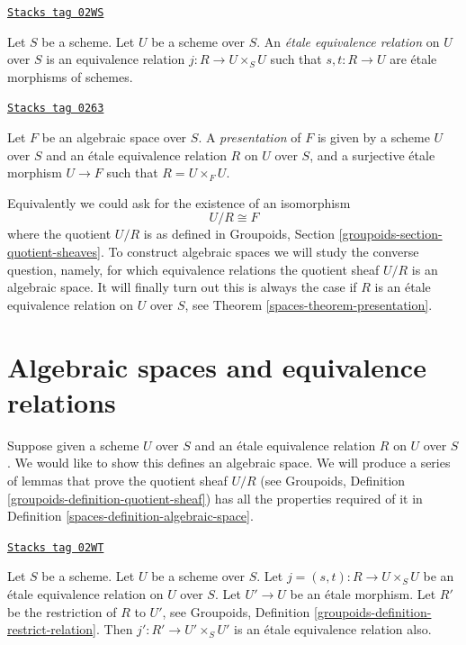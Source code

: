 \begin{definition}
\label{spaces-definition-etale-equivalence-relation}
\href{https://stacks.math.columbia.edu/tag/02WS}{\texttt{Stacks tag 02WS}}

Let $S$ be a scheme. Let $U$ be a scheme over $S$.
An {\it \'etale equivalence relation} on $U$ over $S$
is an equivalence relation $j : R \to U \times_S U$
such that $s, t : R \to U$ are \'etale morphisms of schemes.
\end{definition}

\begin{definition}[Presentation]
\label{spaces-definition-presentation}
\href{https://stacks.math.columbia.edu/tag/0263}{\texttt{Stacks tag 0263}}

Let $F$ be an algebraic space over $S$.
A {\it presentation} of $F$ is given by a scheme
$U$ over $S$ and an \'etale equivalence relation $R$ on $U$ over $S$, and
a surjective \'etale morphism $U \to F$ such that $R = U \times_F U$.
\end{definition}

Equivalently we could ask for the existence of an isomorphism
$$
U/R \cong F
$$
where the quotient $U/R$ is as defined in
Groupoids, Section \ref{groupoids-section-quotient-sheaves}.
To construct algebraic spaces we will study the converse question, namely,
for which equivalence relations the quotient sheaf $U/R$ is an algebraic space.
It will finally turn out this is always the case if $R$ is an \'etale
equivalence relation on $U$ over $S$, see Theorem \ref{spaces-theorem-presentation}.

\section{Algebraic spaces and equivalence relations}
\label{spaces-section-spaces-from-equivalence-relations}
Suppose given a scheme $U$ over $S$
and an \'etale equivalence relation $R$ on $U$ over $S$.
We would like to show this defines an algebraic space.
We will produce a series of lemmas that prove the quotient sheaf $U/R$
(see Groupoids, Definition \ref{groupoids-definition-quotient-sheaf})
has all the properties required
of it in Definition \ref{spaces-definition-algebraic-space}.

\begin{lemma}
\label{spaces-lemma-pullback-etale-equivalence-relation}
\href{https://stacks.math.columbia.edu/tag/02WT}{\texttt{Stacks tag 02WT}}

Let $S$ be a scheme. Let $U$ be a scheme over $S$.
Let $j = (s, t) : R \to U \times_S U$
be an \'etale equivalence relation on $U$ over $S$.
Let $U' \to U$ be an \'etale morphism.
Let $R'$ be the restriction of $R$ to $U'$, see
Groupoids, Definition \ref{groupoids-definition-restrict-relation}.
Then $j' : R' \to U' \times_S U'$ is an \'etale equivalence
relation also.
\end{lemma}

